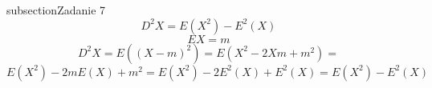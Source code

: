subsection{Zadanie 7}
$$
D^2X = E(X^2) - E^2(X)
$$
$$ 
EX = m
$$
$$
D^2X = E((X-m)^2) = E ( X^2 - 2Xm + m^2) = 
$$
$$
E ( X^2)  - 2mE(X) + m^2 =  E ( X^2)  - 2E^2(X) + E^2(X) = E(X^2) - E^2(X)
$$
